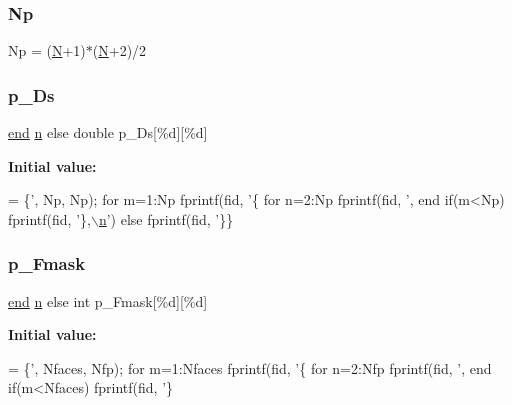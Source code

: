 \subsubsection{\texorpdfstring{Np}{Np}}
{\footnotesize\ttfamily Np = (\hyperlink{a00473_a5b9c4563028063ee53b517cce9aa701b}{N}+1)$\ast$(\hyperlink{a00473_a5b9c4563028063ee53b517cce9aa701b}{N}+2)/2}

\mbox{\label{a00575_acedf935d501d314e9d0c0d676fa4d667}} 
\subsubsection{\texorpdfstring{p\+\_\+\+Ds}{p\_Ds}}
{\footnotesize\ttfamily \hyperlink{a00608_afb358f48b1646c750fb9da6c6585be2b}{end} \hyperlink{a00623_a781a04ab095280f838ff3eb0e51312e0}{n} else double p\+\_\+\+Ds\mbox{[}\%d\mbox{]}\mbox{[}\%d\mbox{]}}

{\bfseries Initial value\+:}
\begin{DoxyCode}
= \{\textcolor{stringliteral}{', Np, Np);}
\textcolor{stringliteral}{for m=1:Np}
\textcolor{stringliteral}{fprintf(fid, '}\{%
\textcolor{stringliteral}{for n=2:Np}
\textcolor{stringliteral}{ fprintf(fid, '}, %
\textcolor{stringliteral}{end}
\textcolor{stringliteral}{if(m<Np)}
\textcolor{stringliteral}{fprintf(fid, '}\},\hyperlink{a00575_a4c2d80ab32fc3a598413ae25e9f2bdce}{\(\backslash\)n}\textcolor{stringliteral}{')}
\textcolor{stringliteral}{else}
\textcolor{stringliteral}{fprintf(fid, '}\}\}
\end{DoxyCode}
\mbox{\label{a00575_a0fc21bbbb980444a6aca246b7ba443d9}} 
\subsubsection{\texorpdfstring{p\+\_\+\+Fmask}{p\_Fmask}}
{\footnotesize\ttfamily \hyperlink{a00608_afb358f48b1646c750fb9da6c6585be2b}{end} \hyperlink{a00623_a781a04ab095280f838ff3eb0e51312e0}{n} else int p\+\_\+\+Fmask\mbox{[}\%d\mbox{]}\mbox{[}\%d\mbox{]}}

{\bfseries Initial value\+:}
\begin{DoxyCode}
= \{\textcolor{stringliteral}{', Nfaces, Nfp);}
\textcolor{stringliteral}{for m=1:Nfaces}
\textcolor{stringliteral}{fprintf(fid, '}\{%
\textcolor{stringliteral}{for n=2:Nfp}
\textcolor{stringliteral}{ fprintf(fid, '}, %
\textcolor{stringliteral}{end}
\textcolor{stringliteral}{if(m<Nfaces)}
\textcolor{stringliteral}{fprintf(fid, '}\}
\end{DoxyCode}
\mbox{\label{a00575_a4d86e706676adc9b0dd7eb7119977cc9}} 
